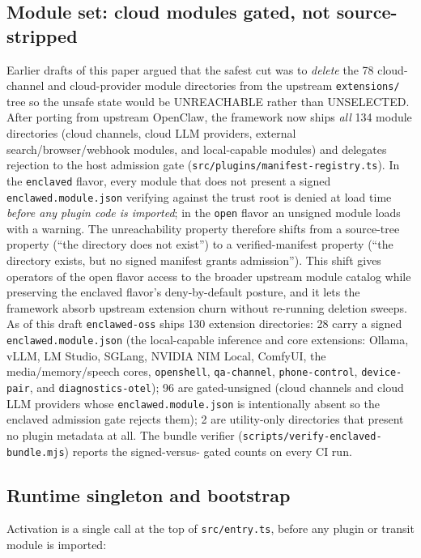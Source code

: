 \documentclass[11pt]{article}
\begin{document}
\subsection{Module set: cloud modules gated, not source-stripped}
\label{sec:moduleset}

Earlier drafts of this paper argued that the safest cut was to
\emph{delete} the 78 cloud-channel and cloud-provider module
directories from the upstream \texttt{extensions/} tree so the unsafe
state would be UNREACHABLE rather than UNSELECTED. After porting from
upstream OpenClaw, the framework now ships \emph{all} 134 module
directories (cloud channels, cloud LLM providers, external
search/browser/webhook modules, and local-capable modules) and
delegates rejection to the host admission gate
(\texttt{src/plugins/manifest-registry.ts}). In the \texttt{enclaved}
flavor, every module that does not present a signed
\texttt{enclawed.module.json} verifying against the trust root is
denied at load time \emph{before any plugin code is imported}; in the
\texttt{open} flavor an unsigned module loads with a warning. The
unreachability property therefore shifts from a source-tree property
(``the directory does not exist'') to a verified-manifest property
(``the directory exists, but no signed manifest grants admission'').
This shift gives operators of the open flavor access to the broader
upstream module catalog while preserving the enclaved flavor's
deny-by-default posture, and it lets the framework absorb upstream
extension churn without re-running deletion sweeps. As of this draft
\texttt{enclawed-oss} ships 130 extension directories: 28 carry a
signed \texttt{enclawed.module.json} (the local-capable inference and
core extensions: Ollama, vLLM, LM Studio, SGLang, NVIDIA NIM Local,
ComfyUI, the media/memory/speech cores, \texttt{openshell},
\texttt{qa-channel}, \texttt{phone-control}, \texttt{device-pair}, and
\texttt{diagnostics-otel}); 96 are gated-unsigned (cloud channels and
cloud LLM providers whose \texttt{enclawed.module.json} is intentionally
absent so the enclaved admission gate rejects them); 2 are utility-only
directories that present no plugin metadata at all. The bundle verifier
(\texttt{scripts/verify-enclaved-bundle.mjs}) reports the signed-versus-
gated counts on every CI run.

\subsection{Runtime singleton and bootstrap}

Activation is a single call at the top of \texttt{src/entry.ts}, before
any plugin or transit module is imported:
\end{document}

